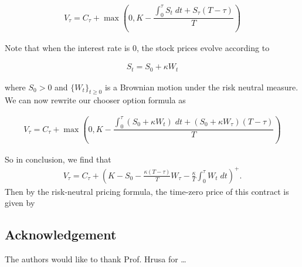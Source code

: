 \documentclass[reqno]{amsart}
\begin{document}
\begin{align}
     V_\tau = C_\tau + \max(0, K - \dfrac{\int_0^\tau S_t \; dt + S_\tau (T - \tau)}{T})
\end{align}

Note that when the interest rate is $0$, the stock prices evolve according to 

\begin{align}
     S_t = S_0 + \kappa W_t
\end{align}

where $S_0 > 0$ and $\{W_t\}_{t \ge 0}$ is a Brownian motion under the risk neutral measure. We can now rewrite our chooser option formula as

\begin{align}
     V_\tau = C_\tau + \max(0, K - \dfrac{\int_0^\tau \left( S_0 + \kappa W_t \right) \; dt + (S_0 + \kappa W_\tau) (T - \tau)}{T})
\end{align}

So in conclusion, we find that 
\begin{align}
     V_\tau = C_\tau + \left(K- S_0 - \frac{\kappa(T-\tau)}{T} W_\tau - \frac{\kappa}{T} \int_0^\tau W_t \; dt  \right)^+.
\end{align}
Then by the risk-neutral pricing formula, the time-zero price of this contract is given by 


\subsection*{Acknowledgement} The authors would like to thank Prof. Hrusa for \dots 

\end{document}
